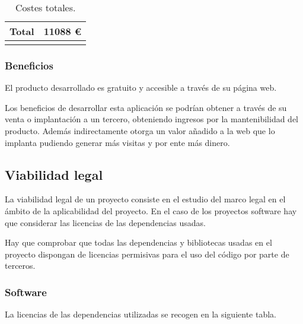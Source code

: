 \begin{longtable}[]{@{}lr@{}}
\midrule

\begin{minipage}[t]{0.38\columnwidth}\raggedright\strut
\textbf{Total}\strut
\end{minipage} & \begin{minipage}[t]{0.20\columnwidth}\raggedright\strut
11088 \euro{}\strut
\end{minipage}\tabularnewline
\bottomrule
\caption{Costes totales.}
\end{longtable}

\subsubsection{Beneficios}

El producto desarrollado es gratuito y accesible a través de su página web.

Los beneficios de desarrollar esta aplicación se podrían obtener a través de su venta o implantación a un tercero, obteniendo ingresos por la mantenibilidad del producto. Además indirectamente otorga un valor añadido a la web que lo implanta pudiendo generar más visitas y por ente más dinero.

\subsection{Viabilidad legal}

La viabilidad legal de un proyecto consiste en el estudio del marco  legal en el ámbito de la aplicabilidad del proyecto. En el caso de los proyectos software hay que considerar las licencias de las dependencias usadas.

Hay que comprobar que todas las dependencias y bibliotecas usadas en el proyecto dispongan de licencias permisivas para el uso del código por parte de terceros.

\subsubsection{Software}

La licencias de las dependencias utilizadas se recogen en la siguiente tabla.


